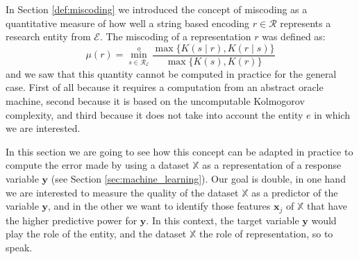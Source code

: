 In Section \ref{def:miscoding} we introduced the concept of miscoding as a quantitative measure of how well a string based encoding $r \in \mathcal{R}$ represents a research entity from $\mathcal{E}$. The miscoding of a representation $r$ was defined as:
\[
\mu(r) = \overset{o}{ \underset{s \in \mathcal{R}_\mathcal{E}} \min} \frac{ \max\{ K(s \mid r), K(r \mid s) \} } { \max\{ K(s), K(r) \} }
\]
and we saw that this quantity cannot be computed in practice for the general case. First of all because it requires a computation from an abstract oracle machine, second because it is based on the uncomputable Kolmogorov complexity, and third because it does not take into account the entity $e$ in which we are interested. 

In this section we are going to see how this concept can be adapted in practice to compute the error made by using a dataset $\mathbb{X}$ as a representation of a response variable $\mathbf{y}$ (see Section \ref{sec:machine_learning}). Our goal is double, in one hand we are interested to measure the quality of the dataset $\mathbb{X}$ as a predictor of the variable $\mathbf{y}$, and in the other we want to identify those features $\mathbf{x}_j$ of $\mathbb{X}$ that have the higher predictive power for $\mathbf{y}$. In this context, the target variable $\mathbf{y}$ would play the role of the entity, and the dataset $\mathbb{X}$ the role of representation, so to speak.

